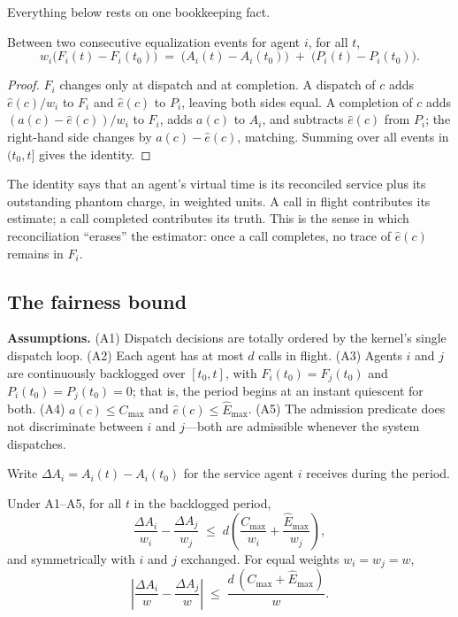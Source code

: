 \documentclass[letterpaper,11pt,leqno]{article}
\begin{document}
Everything below rests on one bookkeeping fact.

\begin{lemma}\label{l:identity}
Between two consecutive equalization events for agent $i$, for all $t$,
\[
  w_i\bigl(F_i(t) - F_i(t_0)\bigr) \;=\; \bigl(A_i(t) - A_i(t_0)\bigr) \;+\; \bigl(P_i(t) - P_i(t_0)\bigr).
\]
\end{lemma}

\begin{proof}
$F_i$ changes only at dispatch and at completion. A dispatch of $c$ adds $\hat{e}(c)/w_i$ to $F_i$ and $\hat{e}(c)$ to $P_i$, leaving both sides equal. A completion of $c$ adds $(a(c) - \hat{e}(c))/w_i$ to $F_i$, adds $a(c)$ to $A_i$, and subtracts $\hat{e}(c)$ from $P_i$; the right-hand side changes by $a(c) - \hat{e}(c)$, matching. Summing over all events in $(t_0, t]$ gives the identity.
\end{proof}

The identity says that an agent's virtual time is its reconciled service plus its outstanding phantom charge, in weighted units. A call in flight contributes its estimate; a call completed contributes its truth. This is the sense in which reconciliation ``erases'' the estimator: once a call completes, no trace of $\hat{e}(c)$ remains in $F_i$.

\subsection{The fairness bound}\label{s:bound}

\textbf{Assumptions.} (A1) Dispatch decisions are totally ordered by the kernel's single dispatch loop. (A2) Each agent has at most $d$ calls in flight. (A3) Agents $i$ and $j$ are continuously backlogged over $[t_0, t]$, with $F_i(t_0) = F_j(t_0)$ and $P_i(t_0) = P_j(t_0) = 0$; that is, the period begins at an instant quiescent for both. (A4) $a(c) \le C_{\max}$ and $\hat{e}(c) \le \hat{E}_{\max}$. (A5) The admission predicate does not discriminate between $i$ and $j$---both are admissible whenever the system dispatches.

Write $\Delta A_i = A_i(t) - A_i(t_0)$ for the service agent $i$ receives during the period.

\begin{theorem}\label{t:rvt}
Under A1--A5, for all $t$ in the backlogged period,
\[
  \frac{\Delta A_i}{w_i} - \frac{\Delta A_j}{w_j} \;\le\; d\left(\frac{C_{\max}}{w_i} + \frac{\hat{E}_{\max}}{w_j}\right),
\]
and symmetrically with $i$ and $j$ exchanged. For equal weights $w_i = w_j = w$,
\[
  \left|\frac{\Delta A_i}{w} - \frac{\Delta A_j}{w}\right| \;\le\; \frac{d\,(C_{\max} + \hat{E}_{\max})}{w}.
\]
\end{theorem}
\end{document}
